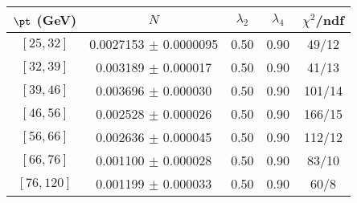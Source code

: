 \begin{tabular}{c||c|c|c|c}
$\pt$ (GeV) & $N$ & $\lambda_{2}$ & $\lambda_4$  & $\chi^2$/ndf  \\
\hline
$[25, 32]$ & 0.0027153 $\pm$ 0.0000095 & 0.50 & 0.90 & 49/12\\
$[32, 39]$ & 0.003189 $\pm$ 0.000017 & 0.50 & 0.90 & 41/13\\
$[39, 46]$ & 0.003696 $\pm$ 0.000030 & 0.50 & 0.90 & 101/14\\
$[46, 56]$ & 0.002528 $\pm$ 0.000026 & 0.50 & 0.90 & 166/15\\
$[56, 66]$ & 0.002636 $\pm$ 0.000045 & 0.50 & 0.90 & 112/12\\
$[66, 76]$ & 0.001100 $\pm$ 0.000028 & 0.50 & 0.90 & 83/10\\
$[76, 120]$ & 0.001199 $\pm$ 0.000033 & 0.50 & 0.90 & 60/8\\
\end{tabular}
